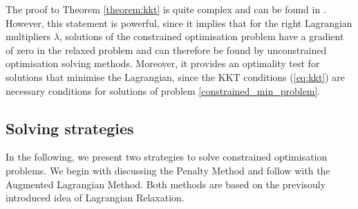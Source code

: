 The proof to Theorem \ref{theorem:kkt} is quite complex and can be found in \cite{NoceWrig06}. However, this statement is powerful, since it implies that for the right Lagrangian multipliers $\lambda$, solutions of the constrained optimisation problem have a gradient of zero in the relaxed problem and can therefore be found by unconstrained optimisation solving methods. Moreover, it provides an optimality test for solutions that minimise the Lagrangian, since the KKT conditions (\ref{eq:kkt}) are necessary conditions for solutions of problem \ref{constrained_min_problem}.\\




\subsection{Solving strategies}
In the following, we present two strategies to solve constrained optimisation problems. We begin with discussing the Penalty Method and follow with the Augmented Lagrangian Method. Both methods are based on the previsouly introduced idea of Lagrangian Relaxation.
